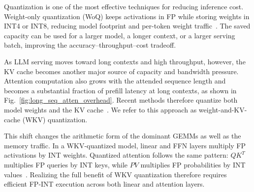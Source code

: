 \documentclass[sigconf,anonymous,nonacm]{acmart}
\newcommand{\fpint}{FP-INT}
\newcommand{\wkv}{WKV}
\begin{document}
Quantization is one of the most effective techniques for reducing inference cost. Weight-only quantization (WoQ) keeps activations in FP while storing weights in INT4 or INT8, reducing model footprint and per-token weight traffic~\cite{frantar2022gptq,lin2023awq,dettmers2023spqr,shao2023omniquant,liu2024spinquant}. The saved capacity can be used for a larger model, a longer context, or a larger serving batch, improving the accuracy--throughput--cost tradeoff.

As LLM serving moves toward long contexts and high throughput, however, the KV cache becomes another major source of capacity and bandwidth pressure\cite{pagedattention}. Attention computation also grows with the attended sequence length and becomes a substantial fraction of prefill latency at long contexts, as shown in Fig.~\ref{fig:long_seq_atten_overhead}\cite{attentionisallyouneed, flashattention, flashattention2}. Recent methods therefore quantize both model weights and the KV cache~\cite{yue2024wkvquant,liu2024spinquant}. We refer to this approach as weight-and-KV-cache (\wkv{}) quantization.

This shift changes the arithmetic form of the dominant GEMMs as well as the memory traffic. In a \wkv{}-quantized model, linear and FFN layers multiply FP activations by INT weights. Quantized attention follows the same pattern: $QK^T$ multiplies FP queries by INT keys, while $PV$ multiplies FP probabilities by INT values~\cite{figna,yue2024wkvquant,liu2024spinquant}. Realizing the full benefit of \wkv{} quantization therefore requires efficient \fpint{} execution across both linear and attention layers.
\end{document}
